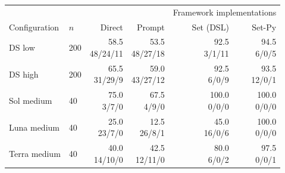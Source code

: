 \begin{tabular}{@{}llrrrr@{}}
\toprule
& & & & \multicolumn{2}{c}{Framework implementations}\\
\cmidrule(l){5-6}
Configuration & $n$ & Direct & Prompt & Set (DSL) & Set-Py\\
\midrule
DS low & 200 & \shortstack[r]{58.5\\{\scriptsize 48/24/11}} & \shortstack[r]{53.5\\{\scriptsize 48/27/18}} & \shortstack[r]{92.5\\{\scriptsize 3/1/11}} & \shortstack[r]{94.5\\{\scriptsize 6/0/5}}\\[3pt]
DS high & 200 & \shortstack[r]{65.5\\{\scriptsize 31/29/9}} & \shortstack[r]{59.0\\{\scriptsize 43/27/12}} & \shortstack[r]{92.5\\{\scriptsize 6/0/9}} & \shortstack[r]{93.5\\{\scriptsize 12/0/1}}\\[3pt]
Sol medium & 40 & \shortstack[r]{75.0\\{\scriptsize 3/7/0}} & \shortstack[r]{67.5\\{\scriptsize 4/9/0}} & \shortstack[r]{100.0\\{\scriptsize 0/0/0}} & \shortstack[r]{100.0\\{\scriptsize 0/0/0}}\\[3pt]
Luna medium & 40 & \shortstack[r]{25.0\\{\scriptsize 23/7/0}} & \shortstack[r]{12.5\\{\scriptsize 26/8/1}} & \shortstack[r]{45.0\\{\scriptsize 16/0/6}} & \shortstack[r]{100.0\\{\scriptsize 0/0/0}}\\[3pt]
Terra medium & 40 & \shortstack[r]{40.0\\{\scriptsize 14/10/0}} & \shortstack[r]{42.5\\{\scriptsize 12/11/0}} & \shortstack[r]{80.0\\{\scriptsize 6/0/2}} & \shortstack[r]{97.5\\{\scriptsize 0/0/1}}\\[3pt]
\bottomrule
\end{tabular}
